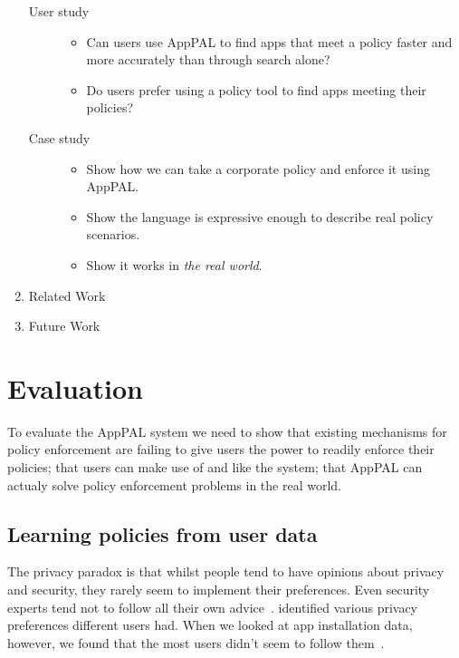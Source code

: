 \documentclass{scrartcl}
\begin{document}
\begin{enumerate}
\begin{description}
      \item[User study]
        \hfill
        \begin{itemize}
          \item Can users use AppPAL to find apps that meet a policy faster and more accurately than through search alone?
          \item Do users prefer using a policy tool to find apps meeting their policies?
        \end{itemize}
      \item[Case study]
        \hfill
        \begin{itemize}
          \item Show how we can take a corporate policy and enforce it using AppPAL.
          \item Show the language is expressive enough to describe real policy scenarios.
          \item Show it works in \emph{the real world}.
        \end{itemize}
    \end{description}
  \item Related Work
  \item Future Work
\end{enumerate}

\section{Evaluation}

To evaluate the AppPAL system we need to show that existing mechanisms for policy enforcement are failing to give users the power to readily enforce their policies;
  that users can make use of and like the system;
  that AppPAL can actualy solve policy enforcement problems in the real world.

\subsection{Learning policies from user data}

The privacy paradox is that whilst people tend to have opinions about privacy and security, they rarely seem to implement their preferences.
Even security experts tend not to follow all their own advice~\citep{Ion:2015uq}.
\citeauthor{Sadeh:2014vq} identified various privacy preferences different users had.
When we looked at app installation data, however, we found that the most users didn't seem to follow them~\citep{Hallett:2015ty}.
\end{document}
